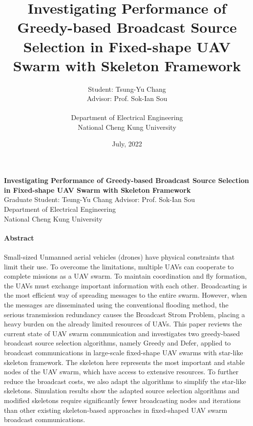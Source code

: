 \documentclass[a4paper,12pt]{report}
\title{
Investigating Performance of Greedy-based 
Broadcast Source Selection in Fixed-shape UAV Swarm 
with Skeleton Framework
\\}
\author{Student: Tsung-Yu Chang \\
Advisor: Prof. Sok-Ian Sou\\
\\
Department of Electrical Engineering  \\
National Cheng Kung University \\
}
\date{July, 2022}
\begin{document}

\maketitle

    \begin{center}
        {\bf\large 
Investigating Performance of Greedy-based 
Broadcast Source Selection in Fixed-shape UAV Swarm 
with Skeleton Framework
}\\
        {Graduate Student: Tsung-Yu Chang \hspace{8mm} Advisor: Prof. Sok-Ian Sou}\\
        {Department of Electrical Engineering}\\
        {National Cheng Kung University}\\
    \end{center}

    \paragraph{}
    \begin{center}
        {\bf Abstract}\\
    \end{center}
    \paragraph{}
Small-sized Unmanned aerial vehicles (drones) have physical constraints that limit their use. To overcome the limitations, multiple UAVs can cooperate to complete missions as a UAV swarm. To maintain coordination and fly formation, the UAVs must exchange important information with each other. Broadcasting is the most efficient way of spreading messages to the entire swarm. However, when the messages are disseminated using the conventional flooding method, the serious transmission redundancy causes the Broadcast Strom Problem, placing a heavy burden on the already limited resources of UAVs. This paper reviews the current state of UAV swarm communication and investigates two greedy-based broadcast source selection algorithms, namely Greedy and Defer, applied to broadcast communications in large-scale fixed-shape UAV swarms with star-like skeleton framework. The skeleton here represents the most important and stable nodes of the UAV swarm, which have access to extensive resources. To further reduce the broadcast costs, we also adapt the algorithms to simplify the star-like skeletons. Simulation results show the adapted source selection algorithms and modified skeletons require significantly fewer broadcasting nodes and iterations than other existing skeleton-based approaches in fixed-shaped UAV swarm broadcast communications.
 
\end{document}
